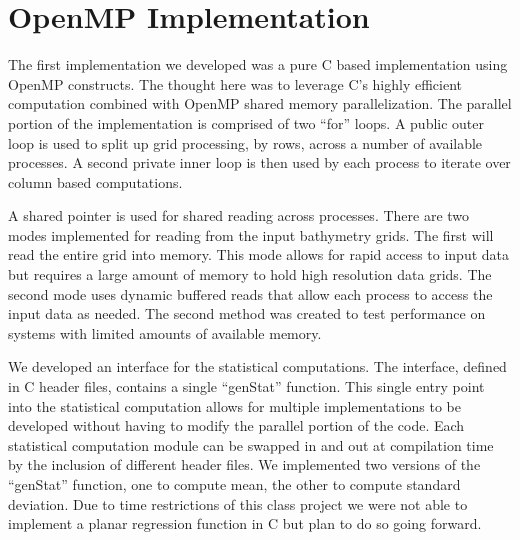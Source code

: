 \section{OpenMP Implementation}

The first implementation we developed was a pure C based implementation using OpenMP constructs. 
The thought here was to leverage C’s highly efficient computation combined with OpenMP shared memory parallelization. 
The parallel portion of the implementation is comprised of two “for” loops. 
A public outer loop is used to split up grid processing, by rows, across a number of available processes. 
A second private inner loop is then used by each process to iterate over column based computations.

\par
A shared pointer is used for shared reading across processes. 
There are two modes implemented for reading from the input bathymetry grids. 
The first will read the entire grid into memory. 
This mode allows for rapid access to input data but requires a large amount of memory to hold high resolution data grids.  
The second mode uses dynamic buffered reads that allow each process to access the input data as needed. 
The second method was created to test performance on systems with limited amounts of available memory.

\par
We developed an interface for the statistical computations.  
The interface, defined in C header files, contains a single “genStat” function. 
This single entry point into the statistical computation allows for multiple implementations to be developed without having to modify the parallel portion of the code. 
Each statistical computation module can be swapped in and out at compilation time by the inclusion of different header files. 
We implemented two versions of the “genStat” function, one to compute mean, the other to compute standard deviation. 
Due to time restrictions of this class project we were not able to implement a planar regression function in C but plan to do so going forward. 